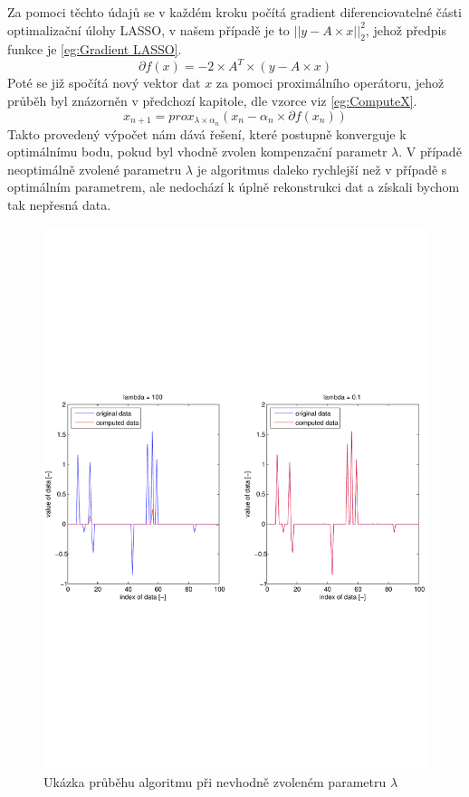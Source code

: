 \documentclass[FM,BP]{tulthesis}
\newcounter{Vzorce}
\begin{document}
Za pomoci těchto údajů se v každém kroku počítá gradient diferenciovatelné části optimalizační úlohy LASSO, v našem případě je to $\left|\right|y-A \times x\left|\right|_{2}^{2}$, jehož předpis funkce je \ref{eg:Gradient LASSO}.
\begin{equation} \label{eg:Gradient LASSO}  \tag{Vzorec \theVzorce}
\partial f(x) = -2 \times A^T \times (y-A \times x)
\end{equation}
Poté se již spočítá nový vektor dat $x$ za pomoci proximálního operátoru, jehož průběh byl znázorněn v předchozí kapitole, dle vzorce viz \ref{eg:ComputeX}. 
\begin{equation} \label{eg:ComputeX}  \tag{Vzorec \theVzorce}
x_{n+1} = prox_{\lambda \times \alpha _{n}}(x_{n}- \alpha _{n} \times \partial f(x_{n}))
\end{equation}
Takto provedený výpočet nám dává řešení, které postupně konverguje k optimálnímu bodu, pokud byl vhodně zvolen kompenzační parametr $\lambda$. V případě neoptimálně zvolené parametru $\lambda$ je algoritmus daleko rychlejší než v případě s optimálním parametrem, ale nedochází k úplně rekonstrukci dat a získali bychom tak nepřesná data.
\begin{figure}[!ht]
	\begin{center}
		\includegraphics[scale=0.70]{obr/lambda.pdf}
	\end{center}
	\caption{Ukázka průběhu algoritmu při nevhodně zvoleném parametru $\lambda$}
	\label{fig:basicLambda}
\end{figure}
\end{document}
